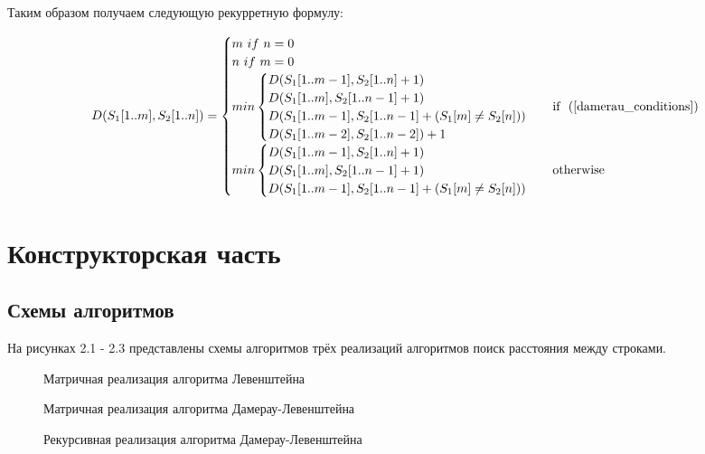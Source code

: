 \documentclass[12pt, a4paper]{report}
\begin{document}
	Таким образом получаем следующую рекурретную формулу:
	
	\begin{equation}
	\label{formula_damerau}
	D(S_{1}[1..m],S_{2}[1..n]) = \begin{cases}
	m\ if\ n = 0\\
	n\ if\ m = 0\\
	min \begin{cases}
		D(S_{1}[1..m-1], S_{2}[1..n] + 1)\\
		D(S_{1}[1..m], S_{2}[1..n-1]+1)\\
		D(S_{1}[1..m-1], S_{2}[1..n-1]+(S_{1}[m] \neq S_{2}[n]))\\
		D(S_{1}[1..m-2], S_{2}[1..n-2])+1
	\end{cases} & \mbox{if ~(\ref{damerau_conditions})}\\	
	min \begin{cases}
		D(S_{1}[1..m-1], S_{2}[1..n] + 1)\\
		D(S_{1}[1..m], S_{2}[1..n-1]+1)\\
		D(S_{1}[1..m-1], S_{2}[1..n-1]+(S_{1}[m] \neq S_{2}[n]))
	\end{cases} & \mbox{otherwise}\\
	\end{cases}
	\end{equation}

	\chapter{Конструкторская часть}
	
	\section{Схемы алгоритмов}
	На рисунках 2.1 - 2.3 представлены схемы алгоритмов трёх реализаций алгоритмов поиск расстояния между строками.
	\begin{figure}[ht!]
		\centering
		\caption{Матричная реализация алгоритма Левенштейна}
		\label{fig:leven}
	\end{figure}

	\begin{figure}[ht!]
		\centering
		\caption{Матричная реализация алгоритма Дамерау-Левенштейна}
		\label{fig:damleven}
	\end{figure}

	\begin{figure}
		\centering
		\caption{Рекурсивная реализация алгоритма Дамерау-Левенштейна}
		\label{fig:damlevenr}
	\end{figure}
\end{document}
